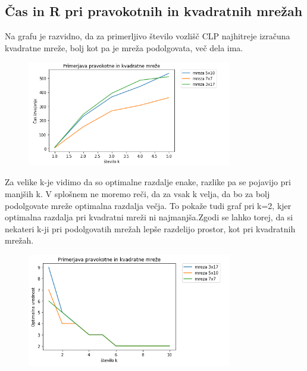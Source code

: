 \documentclass[a4paper]{article}
\begin{document}
\subsection{Čas in R pri pravokotnih in kvadratnih mrežah}
Na grafu je razvidno, da za primerljivo število vozlišč CLP najhitreje izračuna kvadratne mreže, bolj kot pa je mreža podolgovata, več dela ima.
\begin{figure}[h!]
  \centering
  \includegraphics[width= 0.8\textwidth]{cas_pravokotna_vs_kvadratna}
\end{figure}
\newpage

Za velike k-je vidimo da so optimalne razdalje enake, razlike pa se pojavijo pri manjših k. V splošnem ne moremo reči, da za vsak k velja, da bo za bolj podolgovate mreže optimalna razdalja večja. To pokaže tudi graf pri k=2, kjer optimalna razdalja pri kvadratni mreži ni najmanjša.Zgodi se lahko torej, da si nekateri k-ji pri podolgovatih mrežah lepše razdelijo prostor, kot pri kvadratnih mrežah.

\begin{figure}[h!]
  \centering
  \includegraphics[width= 0.8\textwidth]{R_pravokotna_vs_kvadratna}
\end{figure}
\end{document}

